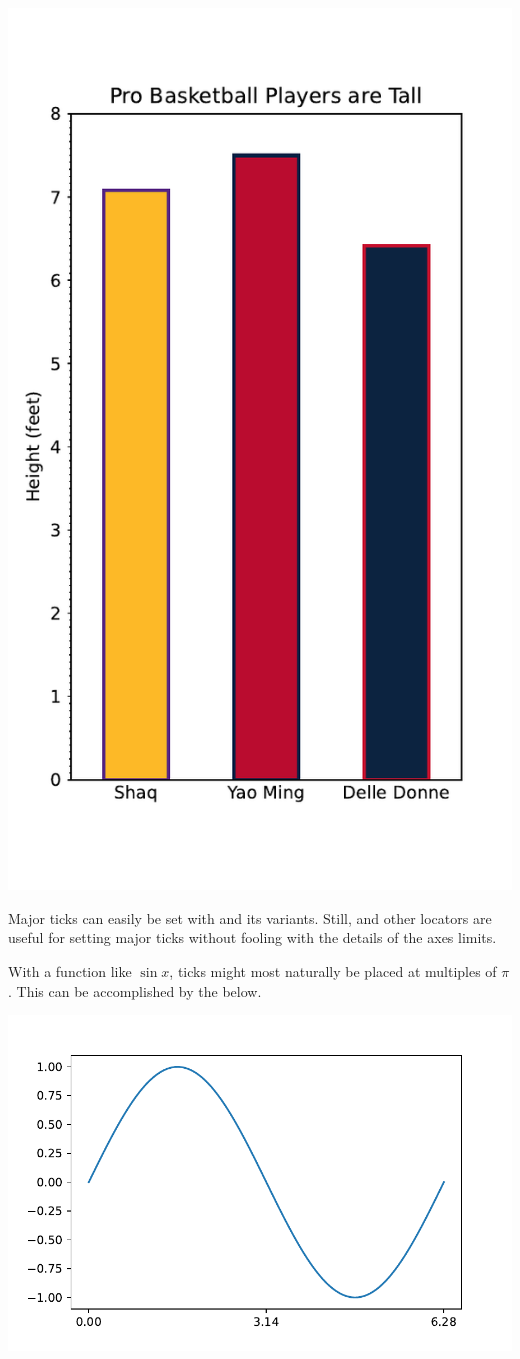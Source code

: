 \begin{center}
    \includegraphics[width = .6\textwidth]{figures/proseplots/tall-ballers.pdf}
\end{center}

Major ticks can easily be set with  and its variants. Still,  and other locators are useful for setting major ticks without fooling with the details of the axes limits. 

With a function like $\sin x$, ticks might most naturally be placed at multiples of $\pi$. This can be accomplished by the below.

\begin{center}
    \includegraphics[width = .6\textwidth]{figures/proseplots/mult-locator.pdf}
\end{center}


